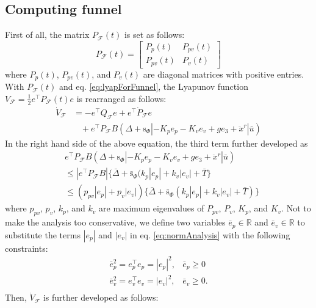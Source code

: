 \documentclass[letterpaper, 10 pt, conference]{ieeeconf}  %
\begin{document}
\subsection{Computing funnel}
First of all, the matrix $P_\mathcal{F}(t)$ is set as follows:
\begin{equation}
P_\mathcal{F}(t) = \left[
\begin{array}{cc}
P_p(t) & P_{pv}(t) \\
P_{pv}(t) & P_v(t)
\end{array}
\right] \nonumber
\end{equation}
where $P_p(t)$, $P_{pv}(t)$, and $P_v(t)$ are diagonal matrices with positive entries.
With $P_\mathcal{F}(t)$ and eq. \eqref{eq:lyapForFunnel}, the Lyapunov function $V_\mathcal{F} = \frac{1}{2}e^\top P_\mathcal{F}(t) e$ is rearranged as follows: 
\begin{align}
\dot{V}_\mathcal{F} &= -e^\top Q_\mathcal{F} e + e^\top \dot{P}_\mathcal{F} e\nonumber \\
&\;\;\;+e^\top P_\mathcal{F} B(\Delta+\text{s}_\Phi|-K_pe_p -K_ve_v + ge_3 + \ddot{x}^r|\bar{u}) \nonumber
\end{align}
In the right hand side of the above equation, the third term further developed as
\begin{align}
&e^\top P_\mathcal{F} B(\Delta+\text{s}_\Phi|-K_p e_p -K_v e_v + ge_3 + \ddot{x}^r|\bar{u}) \nonumber \\
&\leq |e^\top P_\mathcal{F}B|\{\bar{\Delta} + \bar{\text{s}}_\Phi(k_p|e_p| + k_v|e_v| + \bar{T}\} \nonumber \\
&\leq (p_{pv}|e_p|+p_v|e_v|)\{\bar{\Delta}+\bar{\text{s}}_\Phi(k_p|e_p|+k_v|e_v|+\bar{T})\} \label{eq:normAnalysis}
\end{align}
where $p_{pv}$, $p_v$, $k_p$, and $k_v$ are maximum eigenvalues of $P_{pv}$, $P_v$, $K_p$, and $K_v$.
Not to make the analysis too conservative, 
we define two variables $\bar{e}_p\in\mathbb{R}$ and $\bar{e}_v\in\mathbb{R}$ to substitute the terms $|e_p|$ and $|e_v|$ in eq. \eqref{eq:normAnalysis} with the following constraints:
\begin{equation}
\begin{array}{ll}
\bar{e}_p^2 = e_p^\top e_p = |e_p|^2, & \bar{e}_p \geq 0 \\
\bar{e}_v^2 = e_v^\top e_v = |e_v|^2, & \bar{e}_v \geq 0. \\
\end{array} \label{eq:ebarConst} 
\end{equation} 
Then, $\dot{V}_\mathcal{F}$ is further developed as follows:
\end{document}
